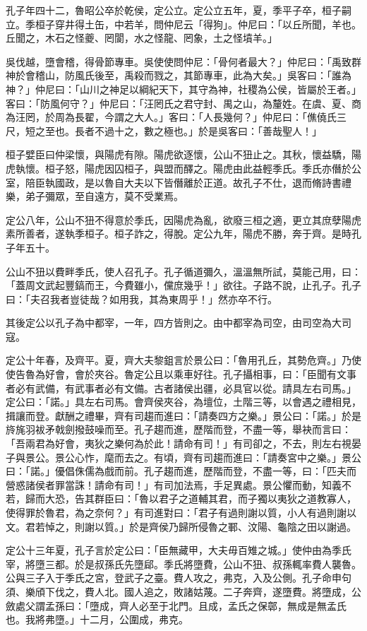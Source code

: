 \begin{pinyinscope}
孔子年四十二，魯昭公卒於乾侯，定公立。定公立五年，夏，季平子卒，桓子嗣立。季桓子穿井得土缶，中若羊，問仲尼云「得狗」。仲尼曰：「以丘所聞，羊也。丘聞之，木石之怪夔、罔閬，水之怪龍、罔象，土之怪墳羊。」

吳伐越，墮會稽，得骨節專車。吳使使問仲尼：「骨何者最大？」仲尼曰：「禹致群神於會稽山，防風氏後至，禹殺而戮之，其節專車，此為大矣。」吳客曰：「誰為神？」仲尼曰：「山川之神足以綱紀天下，其守為神，社稷為公侯，皆屬於王者。」客曰：「防風何守？」仲尼曰：「汪罔氏之君守封、禺之山，為釐姓。在虞、夏、商為汪罔，於周為長翟，今謂之大人。」客曰：「人長幾何？」仲尼曰：「僬僥氏三尺，短之至也。長者不過十之，數之極也。」於是吳客曰：「善哉聖人！」

桓子嬖臣曰仲梁懷，與陽虎有隙。陽虎欲逐懷，公山不狃止之。其秋，懷益驕，陽虎執懷。桓子怒，陽虎因囚桓子，與盟而醳之。陽虎由此益輕季氏。季氏亦僭於公室，陪臣執國政，是以魯自大夫以下皆僭離於正道。故孔子不仕，退而脩詩書禮樂，弟子彌眾，至自遠方，莫不受業焉。

定公八年，公山不狃不得意於季氏，因陽虎為亂，欲廢三桓之適，更立其庶孽陽虎素所善者，遂執季桓子。桓子詐之，得脫。定公九年，陽虎不勝，奔于齊。是時孔子年五十。

公山不狃以費畔季氏，使人召孔子。孔子循道彌久，溫溫無所試，莫能己用，曰：「蓋周文武起豐鎬而王，今費雖小，儻庶幾乎！」欲往。子路不說，止孔子。孔子曰：「夫召我者豈徒哉？如用我，其為東周乎！」然亦卒不行。

其後定公以孔子為中都宰，一年，四方皆則之。由中都宰為司空，由司空為大司寇。

定公十年春，及齊平。夏，齊大夫黎鉏言於景公曰：「魯用孔丘，其勢危齊。」乃使使告魯為好會，會於夾谷。魯定公且以乘車好往。孔子攝相事，曰：「臣聞有文事者必有武備，有武事者必有文備。古者諸侯出疆，必具官以從。請具左右司馬。」定公曰：「諾。」具左右司馬。會齊侯夾谷，為壇位，土階三等，以會遇之禮相見，揖讓而登。獻酬之禮畢，齊有司趨而進曰：「請奏四方之樂。」景公曰：「諾。」於是旍旄羽袚矛戟劍撥鼓噪而至。孔子趨而進，歷階而登，不盡一等，舉袂而言曰：「吾兩君為好會，夷狄之樂何為於此！請命有司！」有司卻之，不去，則左右視晏子與景公。景公心怍，麾而去之。有頃，齊有司趨而進曰：「請奏宮中之樂。」景公曰：「諾。」優倡侏儒為戲而前。孔子趨而進，歷階而登，不盡一等，曰：「匹夫而營惑諸侯者罪當誅！請命有司！」有司加法焉，手足異處。景公懼而動，知義不若，歸而大恐，告其群臣曰：「魯以君子之道輔其君，而子獨以夷狄之道教寡人，使得罪於魯君，為之奈何？」有司進對曰：「君子有過則謝以質，小人有過則謝以文。君若悼之，則謝以質。」於是齊侯乃歸所侵魯之鄆、汶陽、龜陰之田以謝過。

定公十三年夏，孔子言於定公曰：「臣無藏甲，大夫毋百雉之城。」使仲由為季氏宰，將墮三都。於是叔孫氏先墮郈。季氏將墮費，公山不狃、叔孫輒率費人襲魯。公與三子入于季氏之宮，登武子之臺。費人攻之，弗克，入及公側。孔子命申句須、樂頎下伐之，費人北。國人追之，敗諸姑蔑。二子奔齊，遂墮費。將墮成，公斂處父謂孟孫曰：「墮成，齊人必至于北門。且成，孟氏之保鄣，無成是無孟氏也。我將弗墮。」十二月，公圍成，弗克。


\end{pinyinscope}
